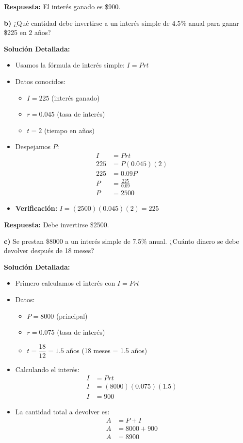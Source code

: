 \textbf{Respuesta:} El interés ganado es \$900.

\medskip

\textbf{b)} ¿Qué cantidad debe invertirse a un interés simple de 4.5\% anual para ganar \$225 en 2 años?

\textbf{Solución Detallada:}
\begin{itemize}
    \item Usamos la fórmula de interés simple: $I = Prt$
    \item Datos conocidos:
    \begin{itemize}
        \item $I = 225$ (interés ganado)
        \item $r = 0.045$ (tasa de interés)
        \item $t = 2$ (tiempo en años)
    \end{itemize}
    \item Despejamos $P$:
    \begin{align*}
    I &= Prt \\
    225 &= P(0.045)(2) \\
    225 &= 0.09P \\
    P &= \frac{225}{0.09} \\
    P &= 2500
    \end{align*}
    \item \textbf{Verificación:} $I = (2500)(0.045)(2) = 225$ \checkmark
\end{itemize}

\textbf{Respuesta:} Debe invertirse \$2500.

\medskip

\textbf{c)} Se prestan \$8000 a un interés simple de 7.5\% anual. ¿Cuánto dinero se debe devolver después de 18 meses?

\textbf{Solución Detallada:}
\begin{itemize}
    \item Primero calculamos el interés con $I = Prt$
    \item Datos:
    \begin{itemize}
        \item $P = 8000$ (principal)
        \item $r = 0.075$ (tasa de interés)
        \item $t = \dfrac{18}{12} = 1.5$ años (18 meses = 1.5 años)
    \end{itemize}
    \item Calculando el interés:
    \begin{align*}
    I &= Prt \\
    I &= (8000)(0.075)(1.5) \\
    I &= 900
    \end{align*}
    \item La cantidad total a devolver es:
    \begin{align*}
    A &= P + I \\
    A &= 8000 + 900 \\
    A &= 8900
    \end{align*}
\end{itemize}

